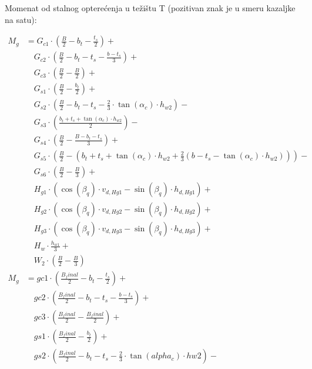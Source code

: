 \documentclass[a4paper, 11pt]{article}
\begin{document}
Momenat od stalnog optere\'cenja u te\v{z}i\v{s}tu T (pozitivan znak je u smeru kazaljke na satu):

\begin{align*}
M_{g} &= G_{c1} \cdot \left( \frac{B}{2} - b_{t} - \frac{t_{s}}{2} \right) +  \\
   &\quad G_{c2} \cdot \left( \frac{B}{2} - b_{t} - t_{s} - \frac{b - t_{s}}{3} \right) + \\
   &\quad G_{c3} \cdot \left( \frac{B}{2} - \frac{B}{2} \right) + \\
   &\quad G_{s1} \cdot \left( \frac{B}{2} - \frac{b_{t}}{2} \right) + \\
   &\quad G_{s2} \cdot \left( \frac{B}{2} - b_{t} - t_{s} - \frac{2}{3} \cdot \tan (\alpha_{c}) \cdot h_{w2} \right) - \\
   &\quad G_{s3} \cdot \left( \frac{b_{t} + t_{s} + \tan (\alpha_{c}) \cdot h_{w2}}{2}  \right) - \\
   &\quad G_{s4} \cdot \left( \frac{B}{2} - \frac{B - b_{t} - t_{s}}{3} \right) + \\
   &\quad G_{s5} \cdot \left( \frac{B}{2} - \left(b_{t} + t_{s} + \tan(\alpha_{c}) \cdot h_{w2} + \frac{2}{3} \left(b - t_{s} - \tan(\alpha_{c}) \cdot h_{w2} \right)\right) \right) - \\
   &\quad G_{s6} \cdot \left( \frac{B}{2} - \frac{B}{3} \right) + \\
   &\quad H_{g1} \cdot  \left( \cos (\beta_{q}) \cdot v_{d,Hg1} -  \sin (\beta_{q}) \cdot h_{d,Hg1} \right) + \\
   &\quad H_{g2} \cdot \left( \cos (\beta_{q}) \cdot v_{d,Hg2} -  \sin (\beta_{q}) \cdot h_{d,Hg2} \right) +  \\
   &\quad H_{g3} \cdot \left( \cos (\beta_{q}) \cdot v_{d,Hg3} -  \sin (\beta_{q}) \cdot h_{d,Hg3} \right) +  \\
   &\quad H_{w} \cdot \frac{h_{w1}}{3} + \\
   &\quad W_2 \cdot \left( \frac{B}{2} - \frac{B}{3} \right) \\
M_{g} &= gc1 \cdot \left( \frac{B_final}{2} - b_t - \frac{t_s}{2} \right) +  \\
   &\quad gc2 \cdot \left( \frac{B_final}{2} - b_t - t_s - \frac{b - t_s}{3} \right) + \\
   &\quad gc3 \cdot \left( \frac{B_final}{2} - \frac{B_final}{2} \right) + \\
   &\quad gs1 \cdot \left( \frac{B_final}{2} - \frac{b_t}{2} \right) + \\
   &\quad gs2 \cdot \left( \frac{B_final}{2} - b_t - t_s - \frac{2}{3} \cdot \tan (alpha_c) \cdot hw2 \right) - \\

\end{align*}
\end{document}
